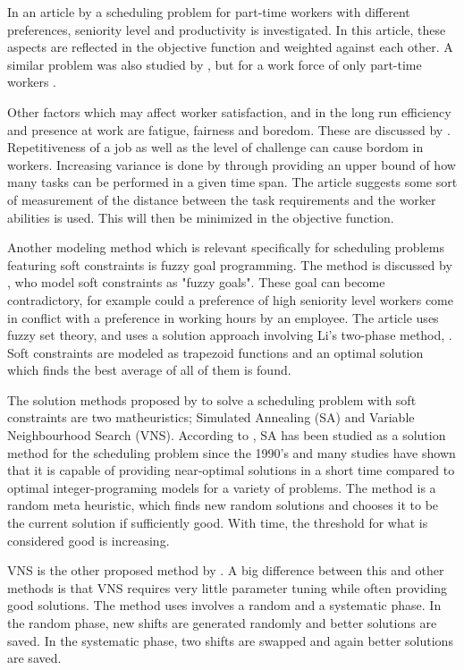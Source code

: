  In an article by \citet{akbari_2013} a scheduling problem for part-time workers with different preferences, seniority level and productivity is investigated. In this article, these aspects are reflected in the objective function and weighted against each other. A similar problem was also studied by \citet{mohan_2008}, but for a work force of only part-time workers . %

Other factors which may affect worker satisfaction, and in the long run efficiency and presence at work are fatigue, fairness and boredom. These are discussed by  \citet{eiselt_2008}. Repetitiveness of a job as well as the level of challenge can cause bordom in workers. Increasing variance is done by \citet{eiselt_2008} through providing an upper bound of how many tasks can be performed in a given time span. The article suggests some sort of measurement of the distance between the task requirements and the worker abilities is used. This will then be minimized in the objective function.

Another modeling method which is relevant specifically for scheduling problems featuring soft constraints is fuzzy goal programming. The method is discussed by \citet{shahnazari_2013}, who model soft constraints as "fuzzy goals". These goal can become contradictory, for example could a preference of high seniority level workers come in conflict with a preference in working hours by an employee. The article uses fuzzy set theory, and uses a solution approach involving Li's two-phase method, \citet{lee_1989}. Soft constraints are modeled as trapezoid functions and an optimal solution which finds the best average of all of them is found.

The solution methods proposed by \citet{akbari_2013} to solve a scheduling problem with soft constraints are two matheuristics; Simulated Annealing (SA) and Variable Neighbourhood Search (VNS). According to \citet{akbari_2013}, SA has been studied as a solution method for the scheduling problem since the 1990's and many studies have shown that it is capable of providing near-optimal solutions in a short time compared to optimal integer-programing models for a variety of problems. The method is a random meta heuristic, which finds new random solutions and chooses it to be the current solution if sufficiently good. With time, the threshold for what is considered good is increasing. 

VNS is the other proposed method by \citet{akbari_2013}. A big difference between this and other methods is that VNS requires very little parameter tuning while often providing good solutions. The method uses involves  a random and a systematic phase. In the random phase, new shifts are generated randomly and better solutions are saved. In the systematic phase, two shifts are swapped and again better solutions are saved.

